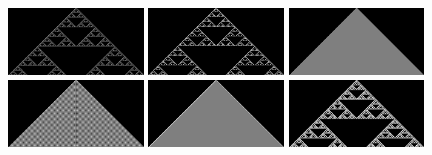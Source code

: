 \documentclass{article}
\begin{document}
\begin{figure}
    \includegraphics[width=0.32\textwidth]{ca-rules/double1-close/rule-018-090-146-218.png}%
    \hspace{0.01\textwidth}%
    \includegraphics[width=0.32\textwidth]{ca-rules/double1-close/rule-022.png}%
    \hspace{0.01\textwidth}%
    \includegraphics[width=0.32\textwidth]{ca-rules/double1-close/rule-050-122-178-250.png}\\%
    \vspace{0.01\textwidth}%
    \includegraphics[width=0.32\textwidth]{ca-rules/double1-close/rule-054.png}%
    \hspace{0.01\textwidth}%
    \includegraphics[width=0.32\textwidth]{ca-rules/double1-close/rule-094.png}%
    \hspace{0.01\textwidth}%
    \includegraphics[width=0.32\textwidth]{ca-rules/double1-close/rule-126.png}\\%
    \vspace{0.01\textwidth}%

\end{figure}
\end{document}
